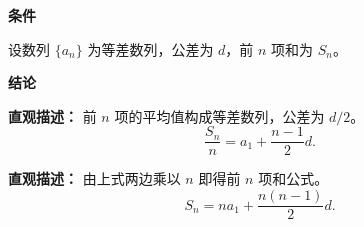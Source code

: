 \begin{statementbox}

	\textbf{\textcolor{CStatement}{条件}}
	\begin{description}[style=nextline, leftmargin=2.8em, labelsep=0.5em, itemsep=0.35em]
		\item[\textbf{\textcolor{CStatement}{条件 1（等差数列）：}}] 设数列 $\{a_n\}$ 为等差数列，公差为 $d$，前 $n$ 项和为 $S_n$。
	\end{description}

	\textbf{\textcolor{CStatement}{结论}}
	\begin{description}[style=nextline, leftmargin=2.8em, labelsep=0.5em, itemsep=0.45em]
		\item[\textbf{\textcolor{CStatement}{结论一（平均等差）：}}]
			\textbf{\textcolor{CStatement}{直观描述：}}
			前 $n$ 项的平均值构成等差数列，公差为 $d/2$。
			\[
				\frac{S_n}{n} = a_1 + \frac{n-1}{2}d.
			\]

		\item[\textbf{\textcolor{CStatement}{常见变形（求和公式）：}}]
			\textbf{\textcolor{CStatement}{直观描述：}}
			由上式两边乘以 $n$ 即得前 $n$ 项和公式。
			\[
				S_n = n a_1 + \frac{n(n-1)}{2}d.
			\]
	\end{description}

\end{statementbox}
